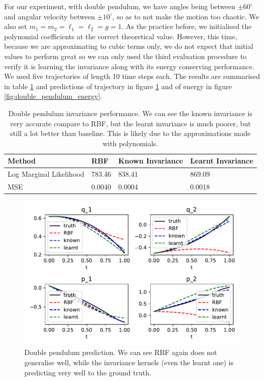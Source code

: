 \documentclass{statsmsc}
\begin{document}
For our experiment, with double pendulum, we have angles being between $\pm 60^\circ$ and angular velocity between $\pm 10^\circ$, so as to not make the motion too chaotic.
We also set $m_1=m_2=\ell_1=\ell_2=g=1.$
As the practice before, we initialised the polynomial coefficients at the correct theoretical value.
However, this time, because we are approximating to cubic terms only, we do not expect that initial values to perform great so we can only used the third evaluation procedure to verify it is learning the invariance along with its energy conserving performance.
We used five trajectories of length 10 time steps each.
The results are summarised in table \ref{tab:double_pendulum_performance} and predictions of trajectory in figure \ref{fig:double_pendulum_prediction} and of energy in figure \ref{fig:double_pendulum_energy}.

\begin{table}[H]
  \centering
  \begin{tabular}{l l l l}
    \hline
Method           & RBF & Known Invariance&  Learnt Invariance\\
  \hline
Log Marginal Likelihood & 783.46 & 838.41 & 869.09  \\
MSE & 0.0040 & 0.0004 & 0.0018 \\
    \hline
  \end{tabular}
  \caption{Double pendulum invariance performance. We can see the known invariance is very accurate compare to RBF, but the learnt invariance is much poorer, but still a lot better than baseline. This is likely due to the approximations made with polynomials.}
  \label{tab:double_pendulum_performance}
\end{table}

\begin{figure}[H] 
  \includegraphics[width=0.8\linewidth]{../codes/figures/double_pendulum_predicted.pdf}
  \centering
  \caption{Double pendulum prediction. We can see RBF again does not generalise well, while the invariance kernels (even the learnt one) is predicting very well to the ground truth.}
  \label{fig:double_pendulum_prediction}
\end{figure}
\end{document}
